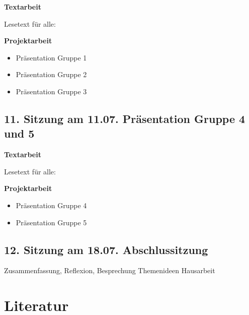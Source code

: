 \documentclass[
  ngerman,
]{article}
\providecommand{\tightlist}{%
  \setlength{\itemsep}{0pt}\setlength{\parskip}{0pt}}
\begin{document}
\textbf{Textarbeit}

Lesetext für alle:

\textbf{Projektarbeit}

\begin{itemize}
\tightlist
\item
  Präsentation Gruppe 1
\item
  Präsentation Gruppe 2
\item
  Präsentation Gruppe 3
\end{itemize}

\hypertarget{sitzung-am-11.07.-pruxe4sentation-gruppe-4-und-5}{%
\subsection*{11. Sitzung am 11.07. \textbar{} Präsentation Gruppe 4 und 5}\label{sitzung-am-11.07.-pruxe4sentation-gruppe-4-und-5}}

\textbf{Textarbeit}

Lesetext für alle:

\textbf{Projektarbeit}

\begin{itemize}
\tightlist
\item
  Präsentation Gruppe 4
\item
  Präsentation Gruppe 5
\end{itemize}

\hypertarget{sitzung-am-18.07.-abschlussitzung}{%
\subsection*{12. Sitzung am 18.07. \textbar{} Abschlussitzung}\label{sitzung-am-18.07.-abschlussitzung}}

Zusammenfassung, Reflexion, Besprechung Themenideen Hausarbeit

\hypertarget{literatur}{%
\section*{Literatur}\label{literatur}}
\end{document}
